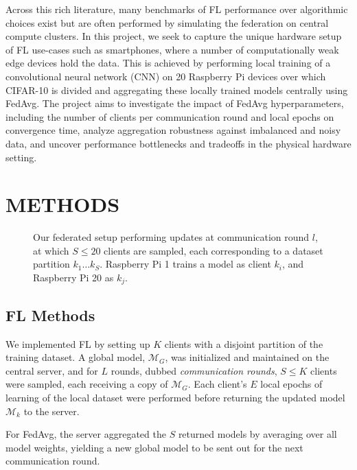 \documentclass{article}
\begin{document}
Across this rich literature, many benchmarks of FL performance over algorithmic choices exist but are often performed by simulating the federation on central compute clusters.
In this project, we seek to capture the unique hardware setup of FL use-cases such as smartphones, where a number of computationally weak edge devices hold the data.
This is achieved by performing local training of a convolutional neural network (CNN) on 20 Raspberry Pi devices over which CIFAR-10 \cite{alex2009learning} is divided and aggregating these locally trained models centrally using FedAvg.
The project aims to investigate the impact of FedAvg hyperparameters, including the number of clients per communication round and local epochs on convergence time, analyze aggregation robustness against imbalanced and noisy data, and uncover performance bottlenecks and tradeoffs in the physical hardware setting.

\section{METHODS}%
\label{sec:methods}

\begin{figure}[htb!]
    \centering
    
    \caption{
        Our federated setup performing updates at communication round $l$, at which $S\leq 20$ clients are sampled, each corresponding to a dataset partition $k_1\ldots k_{S}$.
        Raspberry Pi 1 trains a model as client $k_i$, and Raspberry Pi 20 as $k_j$.
    }
    \label{fig:setup}
\end{figure}\noindent

\subsection{FL Methods}
We implemented FL by setting up $K$ clients with a disjoint partition of the training dataset.
A global model, $\mathcal M_G$, was initialized and maintained on the central server, and for $L$ rounds, dubbed \emph{communication rounds}, $S \leq K$ clients were sampled, each receiving a copy of $\mathcal M_G$.
Each client's $E$ local epochs of learning of the local dataset were performed before returning the updated model $\mathcal M_k$ to the server.

For FedAvg, the server aggregated the $S$ returned models by averaging over all model weights, yielding a new global model to be sent out for the next communication round.
\end{document}
